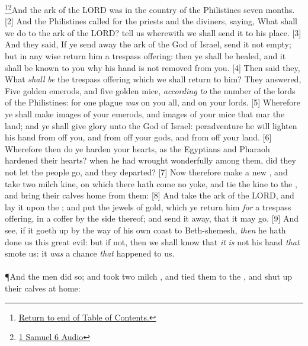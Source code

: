 \footnote{\textcolor[cmyk]{0.99998,1,0,0}{\hyperlink{TOC}{Return to end of Table of Contents.}}}\footnote{\href{https://audiobible.com/bible/1_samuel_6.html}{\textcolor[cmyk]{0.99998,1,0,0}{1 Samuel 6 Audio}}}\textcolor[cmyk]{0.99998,1,0,0}{And the ark of the LORD was in the country of the Philistines seven months.}
[2] \textcolor[cmyk]{0.99998,1,0,0}{And the Philistines called for the priests and the diviners, saying, What shall we do to the ark of the LORD? tell us wherewith we shall send it to his place.}
[3] \textcolor[cmyk]{0.99998,1,0,0}{And they said, If ye send away the ark of the God of Israel, send it not empty; but in any wise return him a trespass offering: then ye shall be healed, and it shall be known to you why his hand is not removed from you.}
[4] \textcolor[cmyk]{0.99998,1,0,0}{Then said they, What \emph{shall} \emph{be} the trespass offering which we shall return to him? They answered, Five golden emerods, and five golden mice, \emph{according} \emph{to} the number of the lords of the Philistines: for one plague \emph{was} on you all, and on your lords.}
[5] \textcolor[cmyk]{0.99998,1,0,0}{Wherefore ye shall make images of your emerods, and images of your mice that mar the land; and ye shall give glory unto the God of Israel: peradventure he will lighten his hand from off you, and from off your gods, and from off your land.}
[6] \textcolor[cmyk]{0.99998,1,0,0}{Wherefore then do ye harden your hearts, as the Egyptians and Pharaoh hardened their hearts? when he had wrought wonderfully among them, did they not let the people go, and they departed?}
[7] \textcolor[cmyk]{0.99998,1,0,0}{Now therefore make a new , and take two milch kine, on which there hath come no yoke, and tie the kine to the , and bring their calves home from them:}
[8] \textcolor[cmyk]{0.99998,1,0,0}{And take the ark of the LORD, and lay it upon the ; and put the jewels of gold, which ye return him \emph{for} a trespass offering, in a coffer by the side thereof; and send it away, that it may go.}
[9] \textcolor[cmyk]{0.99998,1,0,0}{And see, if it goeth up by the way of his own coast to Beth-shemesh, \emph{then} he hath done us this great evil: but if not, then we shall know that \emph{it} \emph{is} not his hand \emph{that} smote us: it \emph{was} a chance \emph{that} happened to us.}\\
\\
\P \textcolor[cmyk]{0.99998,1,0,0}{And the men did so; and took two milch , and tied them to the , and shut up their calves at home:}
